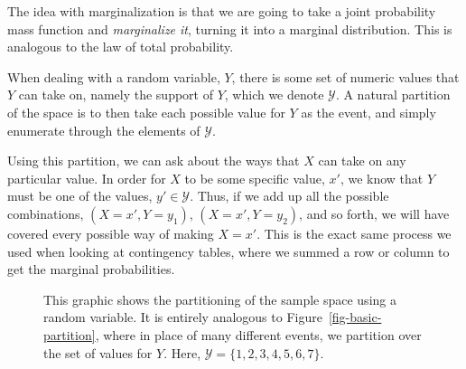 \documentclass[
  letterpaper,
  DIV=11,
  numbers=noendperiod]{scrreprt}
\theoremstyle{definition}
\theoremstyle{definition}
\theoremstyle{definition}
\theoremstyle{remark}
\begin{document}
\begin{tcolorbox}[enhanced jigsaw, rightrule=.15mm, leftrule=.75mm, opacitybacktitle=0.6, title={Marginalization}, colframe=quarto-callout-tip-color-frame, opacityback=0, coltitle=black, breakable, toptitle=1mm, colbacktitle=quarto-callout-tip-color!10!white, bottomtitle=1mm, titlerule=0mm, arc=.35mm, colback=white, toprule=.15mm, left=2mm, bottomrule=.15mm]

The idea with marginalization is that we are going to take a joint
probability mass function and \emph{marginalize it}, turning it into a
marginal distribution. This is analogous to the law of total
probability.

When dealing with a random variable, \(Y\), there is some set of numeric
values that \(Y\) can take on, namely the support of \(Y\), which we
denote \(\mathcal{Y}\). A natural partition of the space is to then take
each possible value for \(Y\) as the event, and simply enumerate through
the elements of \(\mathcal{Y}\).

Using this partition, we can ask about the ways that \(X\) can take on
any particular value. In order for \(X\) to be some specific value,
\(x'\), we know that \(Y\) must be one of the values,
\(y'\in\mathcal{Y}\). Thus, if we add up all the possible combinations,
\((X=x',Y=y_1)\), \((X=x',Y=y_2)\), and so forth, we will have covered
every possible way of making \(X=x'\). This is the exact same process we
used when looking at contingency tables, where we summed a row or column
to get the marginal probabilities.

\begin{figure}[H]

\caption{\label{fig-basic-partition-rv}This graphic shows the
partitioning of the sample space using a random variable. It is entirely
analogous to Figure~\ref{fig-basic-partition}, where in place of many
different events, we partition over the set of values for \(Y\). Here,
\(\mathcal{Y} = \{1,2,3,4,5,6,7\}\).}

\end{figure}
\end{tcolorbox}
\end{document}
